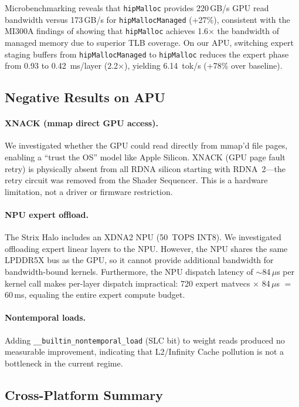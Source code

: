 \documentclass[10pt]{article}
\begin{document}
Microbenchmarking reveals that \texttt{hipMalloc} provides 220\,GB/s GPU read bandwidth versus 173\,GB/s for \texttt{hipMallocManaged} (+27\%), consistent with the MI300A findings of \citet{mi300a_upm} showing that \texttt{hipMalloc} achieves 1.6$\times$ the bandwidth of managed memory due to superior TLB coverage. On our APU, switching expert staging buffers from \texttt{hipMallocManaged} to \texttt{hipMalloc} reduces the expert phase from 0.93 to 0.42~ms/layer (2.2$\times$), yielding 6.14~tok/s (+78\% over baseline).

\subsection{Negative Results on APU}

\paragraph{XNACK (mmap direct GPU access).} We investigated whether the GPU could read directly from mmap'd file pages, enabling a ``trust the OS'' model like Apple Silicon. XNACK (GPU page fault retry) is physically absent from all RDNA silicon starting with RDNA~2---the retry circuit was removed from the Shader Sequencer. This is a hardware limitation, not a driver or firmware restriction.

\paragraph{NPU expert offload.} The Strix Halo includes an XDNA2 NPU (50~TOPS INT8). We investigated offloading expert linear layers to the NPU. However, the NPU shares the same LPDDR5X bus as the GPU, so it cannot provide additional bandwidth for bandwidth-bound kernels. Furthermore, the NPU dispatch latency of $\sim$84\,$\mu$s per kernel call makes per-layer dispatch impractical: 720 expert matvecs $\times$ 84\,$\mu$s $=$ 60\,ms, equaling the entire expert compute budget.

\paragraph{Nontemporal loads.} Adding \texttt{\_\_builtin\_nontemporal\_load} (SLC bit) to weight reads produced no measurable improvement, indicating that L2/Infinity Cache pollution is not a bottleneck in the current regime.

\subsection{Cross-Platform Summary}
\end{document}
